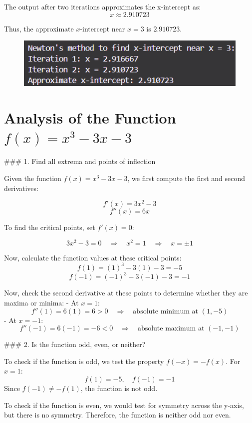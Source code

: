 \documentclass[11pt]{article}
\begin{document}
The output after two iterations approximates the x-intercept as:
\[
x \approx 2.910723
\]

Thus, the approximate \( x \)-intercept near \( x = 3 \) is \( 2.910723 \).

\begin{figure}[!ht]
    \centering
    \includegraphics[width= 1 \textwidth]{images/x_1.png}
    \label{fig:1}
  \end{figure}
  \FloatBarrier

\section{Analysis of the Function \( f(x) = x^3 - 3x - 3 \)}

### 1. Find all extrema and points of inflection

Given the function \( f(x) = x^3 - 3x - 3 \), we first compute the first and second derivatives:

\[
f'(x) = 3x^2 - 3
\]
\[
f''(x) = 6x
\]

To find the critical points, set \( f'(x) = 0 \):

\[
3x^2 - 3 = 0 \quad \Rightarrow \quad x^2 = 1 \quad \Rightarrow \quad x = \pm 1
\]

Now, calculate the function values at these critical points:
\[
f(1) = (1)^3 - 3(1) - 3 = -5
\]
\[
f(-1) = (-1)^3 - 3(-1) - 3 = -1
\]

Now, check the second derivative at these points to determine whether they are maxima or minima:
- At \( x = 1 \):
  \[
  f''(1) = 6(1) = 6 > 0 \quad \Rightarrow \quad \text{absolute minimum at } (1, -5)
  \]
- At \( x = -1 \):
  \[
  f''(-1) = 6(-1) = -6 < 0 \quad \Rightarrow \quad \text{absolute maximum at } (-1, -1)
  \]

### 2. Is the function odd, even, or neither?

To check if the function is odd, we test the property \( f(-x) = -f(x) \). For \( x = 1 \):
\[
f(1) = -5, \quad f(-1) = -1
\]
Since \( f(-1) \neq -f(1) \), the function is not odd.

To check if the function is even, we would test for symmetry across the y-axis, but there is no symmetry. Therefore, the function is neither odd nor even.
\end{document}
